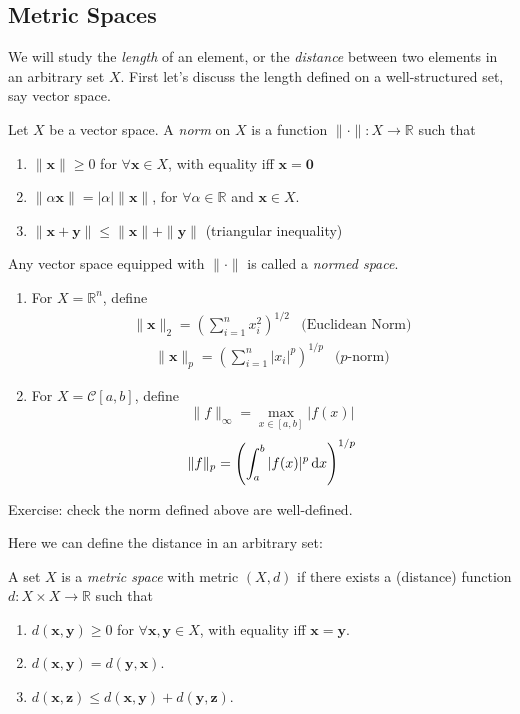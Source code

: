 \subsection{Metric Spaces}
We will study the \emph{length} of an element, or the \emph{distance} between two elements in an arbitrary set $X$. First let's discuss the length defined on a well-structured set, say vector space.
\begin{definition}
Let $X$ be a vector space. A \emph{norm} on $X$ is a function $\|\cdot\|:X\to\mathbb{R}$ such that
\begin{enumerate}
\item
$\|\bm x\|\ge0$ for $\forall\bm x\in X$, with equality iff $\bm x=\bm0$
\item
$\|\alpha\bm x\|=|\alpha|\|\bm x\|$, for $\forall\alpha\in\mathbb{R}$ and $\bm x\in X$.
\item
$\|\bm x+\bm y\|\le\|\bm x\|+\|\bm y\|$ (triangular inequality)
\end{enumerate}
Any vector space equipped with $\|\cdot\|$ is called a \emph{normed space}.
\end{definition}
\begin{example}\label{Exp:1:7}
\begin{enumerate}
\item
For $X=\mathbb{R}^n$, define 
\[
\begin{array}{ll}
\|\bm x\|_2=\left(\sum_{i=1}^nx_i^2\right)^{1/2}
&
\mbox{(Euclidean Norm)}
\end{array}
\]
\[
\begin{array}{ll}
\|\bm x\|_p=\left(\sum_{i=1}^n|x_i|^p\right)^{1/p}
&
\mbox{($p$-norm)}
\end{array}
\]
\item
For $X=\mathcal{C}[a,b]$, define 
\[
\|f\|_\infty=\max_{x\in[a,b]}|f(x)|
\]
\[
\|f\|_p=\left(\int_a^b|f(x)|^p\,\mathrm{d} x\right)^{1/p}
\]
\end{enumerate}
Exercise: check the norm defined above are well-defined.
\end{example}
Here we can define the distance in an arbitrary set:
\begin{definition}
A set $X$ is a \emph{metric space} with metric $(X,d)$ if there exists a (distance) function $d:X\times X\to\mathbb{R}$ such that 
\begin{enumerate}
\item
$d(\bm x,\bm y)\ge0$ for $\forall \bm x,\bm y\in X$, with equality iff $\bm x=\bm y$.
\item
$d(\bm x,\bm y)=d(\bm y,\bm x)$.
\item
$d(\bm x,\bm z)\le d(\bm x,\bm y)+d(\bm y,\bm z)$.
\end{enumerate}
\end{definition}
